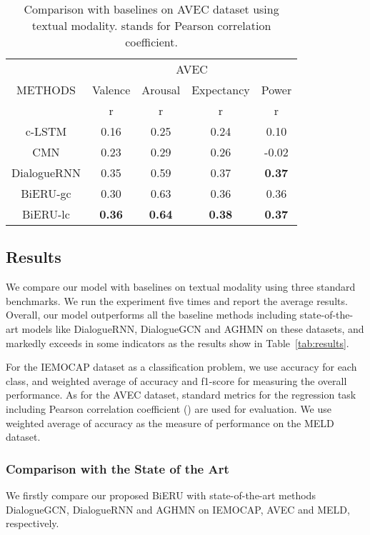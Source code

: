 \documentclass[journal]{IEEEtran}
\begin{document}
\begin{table}[!ht]
    \centering
    \begin{tabular}{|c|c|c|c|c|}
    \hline
    \multirow{3}{*}{METHODS} & \multicolumn{4}{c|}{AVEC} \\
    \cline{2-5}
    & \multicolumn{1}{c|}{Valence} & \multicolumn{1}{c|}{Arousal} & \multicolumn{1}{c|}{Expectancy} & \multicolumn{1}{c|}{Power} \\
    \cline{2-5}
	&	r	&	r	&	r	&	r \\

\hline
c-LSTM & 0.16 & 0.25 & 0.24 & 0.10   \\
\hline
CMN &  0.23 & 0.29 &  0.26 & -0.02  \\
\hline
DialogueRNN	&	0.35	&	0.59	&	0.37	&	\textbf{0.37}   \\
\hline
BiERU-gc	& 0.30	&	0.63	&	0.36	&	0.36  \\
\hline
BiERU-lc	& \textbf{0.36}	&	\textbf{0.64}	&	\textbf{0.38}	&	\textbf{0.37} \\
    \hline
    \end{tabular}
\linespread{1}
    \caption{Comparison with baselines on AVEC dataset using textual modality.  stands for Pearson correlation coefficient.}
    \label{tab:result_avec}
\end{table}



\subsection{Results}
We compare our model with baselines on textual modality using three standard benchmarks. We run the experiment five times and report the average results. Overall, our model outperforms all the baseline methods including state-of-the-art models like DialogueRNN, DialogueGCN and AGHMN on these datasets, and markedly exceeds in some indicators as the results show in Table~\ref{tab:results}. 

For the IEMOCAP dataset as a classification problem, we use accuracy for each class, and weighted average of accuracy and f1-score for measuring the overall performance. As for the AVEC dataset, standard metrics for the regression task including Pearson correlation coefficient () are used for evaluation. We use weighted average of accuracy as the measure of performance on the MELD dataset.

\subsubsection{Comparison with the State of the Art}
We firstly compare our proposed BiERU with state-of-the-art methods DialogueGCN, DialogueRNN and AGHMN on IEMOCAP, AVEC and MELD, respectively.
\end{document}
